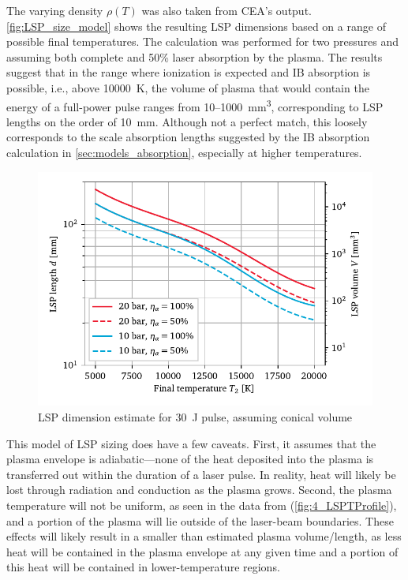         The varying density $\rho(T)$ was also taken from CEA's output. \autoref{fig:LSP_size_model} shows the resulting LSP dimensions based on a range of possible final temperatures. The calculation was performed for two pressures and assuming both complete and 50\% laser absorption by the plasma. The results suggest that in the range where ionization is expected and IB absorption is possible, i.e., above \qty{10000}{K}, the volume of plasma that would contain the energy of a full-power pulse ranges from 10--1000~\unit{mm^3}, corresponding to LSP lengths on the order of \qty{10}{mm}. Although not a perfect match, this loosely corresponds to the scale absorption lengths suggested by the IB absorption calculation in \autoref{sec:models_absorption}, especially at higher temperatures.

        \begin{figure}[h]
            \centering
            \includegraphics[]{assets/4 models/volume_est.pdf}
            \caption{LSP dimension estimate for \qty{30}{J} pulse, assuming conical volume}
            \label{fig:LSP_size_model}
        \end{figure}

        This model of LSP sizing does have a few caveats. First, it assumes that the plasma envelope is adiabatic---none of the heat deposited into the plasma is transferred out within the duration of a laser pulse. In reality, heat will likely be lost through radiation and conduction as the plasma grows. Second, the plasma temperature will not be uniform, as seen in the data from \textcite{welleEnergyConversionEfficiency1986} (\autoref{fig:4_LSPTProfile}), and a portion of the plasma will lie outside of the laser-beam boundaries. These effects will likely result in a smaller than estimated plasma volume/length, as less heat will be contained in the plasma envelope at any given time and a portion of this heat will be contained in lower-temperature regions.

